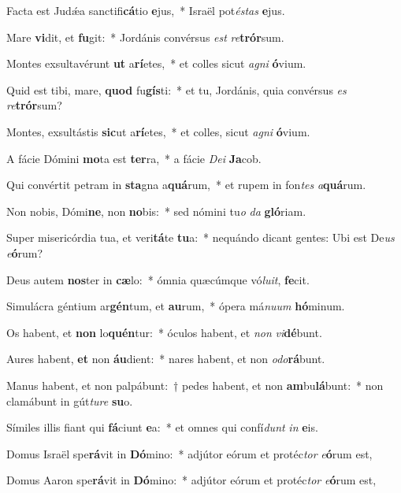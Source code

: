 \item Facta est Judǽa sanctifi\textbf{cá}tio \textbf{e}jus,~* Israël pot\textit{és}\textit{tas} \textbf{e}jus.
\item Mare \textbf{vi}dit, et \textbf{fu}git:~* Jordánis convérsus \textit{est} \textit{re}\textbf{trór}sum.
\item Montes exsultavérunt \textbf{ut} a\textbf{rí}etes,~* et colles sicut \textit{a}\textit{gni} \textbf{ó}vium.
\item Quid est tibi, mare, \textbf{quod} fu\textbf{gís}ti:~* et tu, Jordánis, quia convérsus \textit{es} \textit{re}\textbf{trór}sum?
\item Montes, exsultástis \textbf{sic}ut a\textbf{rí}etes,~* et colles, sicut \textit{a}\textit{gni} \textbf{ó}vium.
\item A fácie Dómini \textbf{mo}ta est \textbf{ter}ra,~* a fácie \textit{De}\textit{i} \textbf{Ja}cob.
\item Qui convértit petram in \textbf{sta}gna a\textbf{quá}rum,~* et rupem in fon\textit{tes} \textit{a}\textbf{quá}rum.
\item Non nobis, Dómi\textbf{ne}, non \textbf{no}bis:~* sed nómini tu\textit{o} \textit{da} \textbf{gló}riam.
\item Super misericórdia tua, et veri\textbf{tá}te \textbf{tu}a:~* nequándo dicant gentes: Ubi est De\textit{us} \textit{e}\textbf{ó}rum?
\item Deus autem \textbf{nos}ter in \textbf{cæ}lo:~* ómnia quæcúmque vó\textit{lu}\textit{it}, \textbf{fe}cit.
\item Simulácra géntium ar\textbf{gén}tum, et \textbf{au}rum,~* ópera má\textit{nu}\textit{um} \textbf{hó}minum.
\item Os habent, et \textbf{non} lo\textbf{quén}tur:~* óculos habent, et \textit{non} \textit{vi}\textbf{dé}bunt.
\item Aures habent, \textbf{et} non \textbf{áu}dient:~* nares habent, et non \textit{o}\textit{do}\textbf{rá}bunt.
\item Manus habent, et non palpábunt:~† pedes habent, et non \textbf{am}bu\textbf{lá}bunt:~* non clamábunt in gút\textit{tu}\textit{re} \textbf{su}o.
\item Símiles illis fiant qui \textbf{fá}ciunt \textbf{e}a:~* et omnes qui confí\textit{dunt} \textit{in} \textbf{e}is.
\item Domus Israël spe\textbf{rá}vit in \textbf{Dó}mino:~* adjútor eórum et protéc\textit{tor} \textit{e}\textbf{ó}rum est,
\item Domus Aaron spe\textbf{rá}vit in \textbf{Dó}mino:~* adjútor eórum et protéc\textit{tor} \textit{e}\textbf{ó}rum est,
